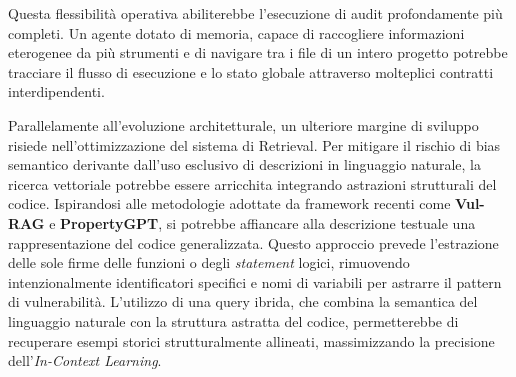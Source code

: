 Questa flessibilità operativa abiliterebbe l'esecuzione di audit profondamente più completi. Un agente dotato di memoria, capace di raccogliere informazioni eterogenee da più strumenti e di navigare tra i file di un intero progetto potrebbe tracciare il flusso di esecuzione e lo stato globale attraverso molteplici contratti interdipendenti.

Parallelamente all'evoluzione architetturale, un ulteriore margine di sviluppo risiede nell'ottimizzazione del sistema di Retrieval. Per mitigare il rischio di bias semantico derivante dall'uso esclusivo di descrizioni in linguaggio naturale, la ricerca vettoriale potrebbe essere arricchita integrando astrazioni strutturali del codice. Ispirandosi alle metodologie adottate da framework recenti come \textbf{Vul-RAG} e \textbf{PropertyGPT}, si potrebbe affiancare alla descrizione testuale una rappresentazione del codice generalizzata. Questo approccio prevede l'estrazione delle sole firme delle funzioni o degli \textit{statement} logici, rimuovendo intenzionalmente identificatori specifici e nomi di variabili per astrarre il pattern di vulnerabilità. L'utilizzo di una query ibrida, che combina la semantica del linguaggio naturale con la struttura astratta del codice, permetterebbe di recuperare esempi storici strutturalmente allineati, massimizzando la precisione dell'\textit{In-Context Learning}. 